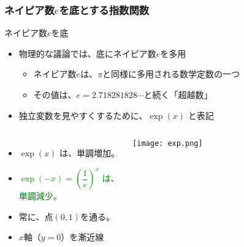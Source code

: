\documentclass[12pt, dvipdfmx]{beamer}
\begin{document}
\begin{frame}
	\frametitle{ネイピア数$e$を底とする指数関数}
		\begin{exampleblock}{ネイピア数$e$を底}
			\begin{itemize}
				\item 物理的な議論では、底にネイピア数$e$を多用
				\begin{itemize}
					\item ネイピア数$e$は、$\pi$と同様に多用される数学定数の一つ
					\item その値は、$e=2.718281828 \cdots $と続く「超越数」
				\end{itemize}
				\item 独立変数を見やすくするために、$\exp (x)$ と表記
			\end{itemize}
		\end{exampleblock}
		\begin{columns}[T, onlytextwidth]
				\begin{itemize}
					\item \alert{$\exp (x)$ は、単調増加。}
					\item \textcolor{green}{$\exp (-x) = \left(\dfrac{1}{e} \right)^x$ は、\\単調減少。}
					\item 常に、点$(0,1)$を通る。
					\item $x$軸（$y=0$）を漸近線
				\end{itemize}
				\begin{center}
					\texttt{[image: exp.png]}
				\end{center}
		\end{columns}
\end{frame}
\end{document}
